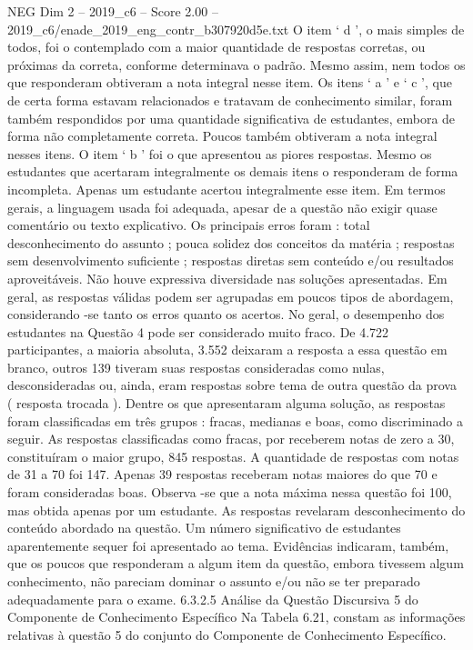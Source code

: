 \begin{textsample}{NEG Dim 2 – 2019\_c6 – Score 2.00 – 2019\_c6/enade\_2019\_eng\_contr\_b307920d5e.txt}
O item ‘ d ’, o mais simples de todos, foi o contemplado com a maior quantidade de respostas corretas, ou próximas da correta, conforme determinava o padrão.
Mesmo assim, nem todos os que responderam obtiveram a nota integral nesse item.
Os itens ‘ a ’ e ‘ c ’, que de certa forma estavam relacionados e tratavam de conhecimento similar, foram também respondidos por uma quantidade significativa de estudantes, embora de forma não completamente correta.
Poucos também obtiveram a nota integral nesses itens.
O item ‘ b ’ foi o que apresentou as piores respostas.
Mesmo os estudantes que acertaram integralmente os demais itens o responderam de forma incompleta.
Apenas um estudante acertou integralmente esse item.
Em termos gerais, a linguagem usada foi adequada, apesar de a questão não exigir quase comentário ou texto explicativo.
Os principais erros foram : total desconhecimento do assunto ; pouca solidez dos conceitos da matéria ; respostas sem desenvolvimento suficiente ; respostas diretas sem conteúdo e/ou resultados aproveitáveis.
Não houve expressiva diversidade nas soluções apresentadas.
Em geral, as respostas válidas podem ser agrupadas em poucos tipos de abordagem, considerando -se tanto os erros quanto os acertos.
No geral, o desempenho dos estudantes na Questão 4 pode ser considerado muito fraco.
De 4.722 participantes, a maioria absoluta, 3.552 deixaram a resposta a essa questão em branco, outros 139 tiveram suas respostas consideradas como nulas, desconsideradas ou, ainda, eram respostas sobre tema de outra questão da prova ( resposta trocada ).
Dentre os que apresentaram alguma solução, as respostas foram classificadas em três grupos : fracas, medianas e boas, como discriminado a seguir.
As respostas classificadas como fracas, por receberem notas de zero a 30, constituíram o maior grupo, 845 respostas.
A quantidade de respostas com notas de 31 a 70 foi 147.
Apenas 39 respostas receberam notas maiores do que 70 e foram consideradas boas.
Observa -se que a nota máxima nessa questão foi 100, mas obtida apenas por um estudante.
As respostas revelaram desconhecimento do conteúdo abordado na questão.
Um número significativo de estudantes aparentemente sequer foi apresentado ao tema.
Evidências indicaram, também, que os poucos que responderam a algum item da questão, embora tivessem algum conhecimento, não pareciam dominar o assunto e/ou não se ter preparado adequadamente para o exame. 6.3.2.5 Análise da Questão Discursiva 5 do Componente de Conhecimento Específico Na Tabela 6.21, constam as informações relativas à questão 5 do conjunto do Componente de Conhecimento Específico.

\end{textsample}
